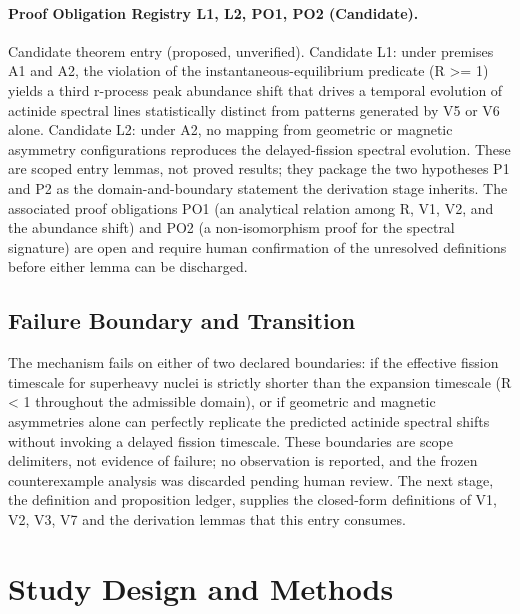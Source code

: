\documentclass[conference]{IEEEtran}
\begin{document}
\paragraph{Proof Obligation Registry L1, L2, PO1, PO2 (Candidate).} Candidate theorem entry (proposed, unverified). Candidate L1: under premises A1 and A2, the violation of the instantaneous-equilibrium predicate (R >= 1) yields a third r-process peak abundance shift that drives a temporal evolution of actinide spectral lines statistically distinct from patterns generated by V5 or V6 alone. Candidate L2: under A2, no mapping from geometric or magnetic asymmetry configurations reproduces the delayed-fission spectral evolution. These are scoped entry lemmas, not proved results; they package the two hypotheses P1 and P2 as the domain-and-boundary statement the derivation stage inherits. The associated proof obligations PO1 (an analytical relation among R, V1, V2, and the abundance shift) and PO2 (a non-isomorphism proof for the spectral signature) are open and require human confirmation of the unresolved definitions before either lemma can be discharged.

\subsection{Failure Boundary and Transition}
The mechanism fails on either of two declared boundaries: if the effective fission timescale for superheavy nuclei is strictly shorter than the expansion timescale (R < 1 throughout the admissible domain), or if geometric and magnetic asymmetries alone can perfectly replicate the predicted actinide spectral shifts without invoking a delayed fission timescale. These boundaries are scope delimiters, not evidence of failure; no observation is reported, and the frozen counterexample analysis was discarded pending human review. The next stage, the definition and proposition ledger, supplies the closed-form definitions of V1, V2, V3, V7 and the derivation lemmas that this entry consumes.

\section{Study Design and Methods}
\end{document}
